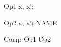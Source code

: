 \documentclass{article}
\begin{document}
\begin{zdirectives}
\end{zdirectives}

\begin{zed}
  [NAME]
\end{zed}
\begin{schema}{Op1}
  x, x': \nat
\end{schema}
\begin{schema}{Op2}
  x, x': NAME
\end{schema}
\begin{schema}{Comp}
  Op1 \semi Op2
\end{schema}
\end{document}
